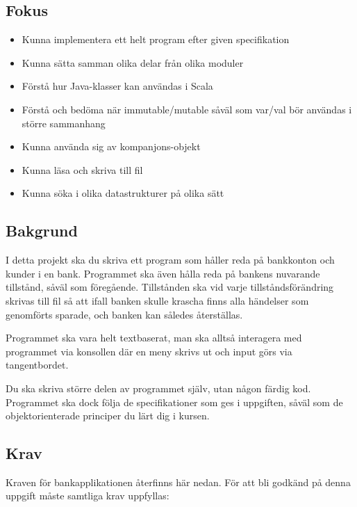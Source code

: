 

\subsection{Fokus}
\begin{itemize}[nosep,label={$\square$},leftmargin=*]
\item Kunna implementera ett helt program efter given specifikation
\item Kunna sätta samman olika delar från olika moduler
\item Förstå hur Java-klasser kan användas i Scala
\item Förstå och bedöma när immutable/mutable såväl som var/val bör användas i större sammanhang
\item Kunna använda sig av kompanjons-objekt
\item Kunna läsa och skriva till fil
\item Kunna söka i olika datastrukturer på olika sätt
\end{itemize}

\subsection{Bakgrund}

I detta projekt ska du skriva ett program som håller reda på bankkonton och kunder i en bank. Programmet ska även hålla reda på bankens nuvarande tillstånd, såväl som föregående.
Tillstånden ska vid varje tillståndsförändring skrivas till fil så att ifall banken skulle krascha finns alla händelser som genomförts sparade, och banken kan således återställas.

Programmet ska vara helt textbaserat, man ska alltså interagera med programmet via konsollen där en meny skrivs ut och input görs via tangentbordet.

Du ska skriva större delen av programmet själv, utan någon färdig kod. Programmet ska dock följa de specifikationer som ges i uppgiften, såväl som de objektorienterade principer du lärt dig i kursen.

\subsection{Krav}

Kraven för bankapplikationen återfinns här nedan. För att bli godkänd på denna uppgift måste samtliga krav uppfyllas:

